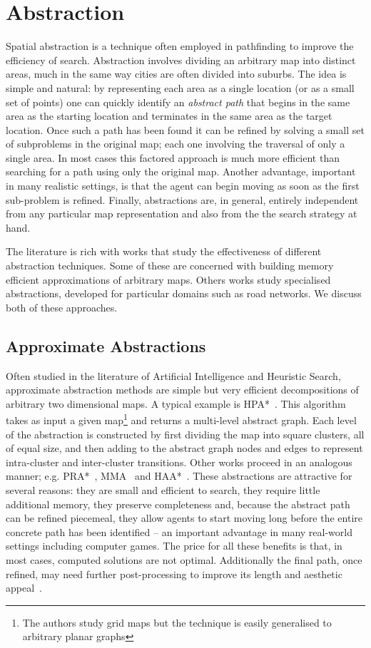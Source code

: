 \section{Abstraction}
\label{cha::lit::abstraction}
Spatial abstraction is a technique often employed in pathfinding to improve
the efficiency of search. Abstraction involves dividing an arbitrary map into
distinct areas, much in the same way cities are often divided into suburbs.
The idea is simple and natural: by representing each area as a single location 
(or as a small set of points) one can quickly identify an \emph{abstract path} 
that begins in the same area as the starting location and terminates in the
same area as the target location.  Once such a path has
been found it can be refined by solving a small set of subproblems in the
original map; each one involving the traversal of only a single area. In most
cases this factored approach is much more efficient than searching for a path
using only the original map. Another advantage, important in many realistic 
settings, is that the agent can begin moving
as soon as the first sub-problem is refined. Finally, abstractions 
are, in general, entirely independent from any particular map representation and 
also from the the search strategy at hand.

The literature is rich with works that study the effectiveness of different
abstraction techniques.  Some of these are concerned with building memory 
efficient approximations of arbitrary maps.  Others works study specialised 
abstractions, developed for particular domains such as road networks. 
We discuss both of these approaches.

\subsection{Approximate Abstractions}
Often studied in the literature of Artificial Intelligence and Heuristic
Search, approximate abstraction methods are simple but very efficient
decompositions of arbitrary two dimensional maps.  A typical example is
HPA*~\citep{botea04}. This algorithm takes as input a given map\footnote{The
authors study grid maps but the technique is easily generalised to arbitrary
planar graphs} and returns a multi-level abstract graph.  Each level of the
abstraction is constructed by first dividing the map into square clusters, all
of equal size, and then adding to the abstract graph nodes and edges to
represent intra-cluster and inter-cluster transitions.  Other works proceed in
an analogous manner; e.g. PRA*~\citep{sturtevant05}, MMA~\citep{sturtevant07}
and HAA*~\citep{harabor08}.  These abstractions are attractive for several
reasons: they are small and efficient to search, they require little
additional memory, they preserve completeness and, because the abstract path 
can be refined piecemeal, they allow agents to start moving long before the 
entire concrete path has been identified -- an important advantage in many
real-world settings including computer games.
The price for all these benefits is that, in most cases, computed solutions
are not optimal.  Additionally the final path, once refined, may need further
post-processing to improve its length and aesthetic appeal~\citep{pinter01,botea04}.


